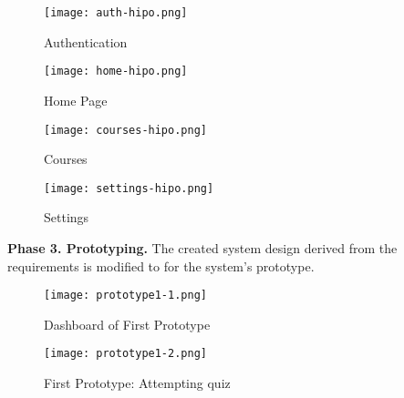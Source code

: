 \vspace{1cm}

\begin{figure}[h!]
   \begin{center}
      \texttt{[image: auth-hipo.png]}
      \caption{Authentication}
   \end{center}
\end{figure}

\vspace{1cm}

\begin{figure}[h!]
   \begin{center}
      \texttt{[image: home-hipo.png]}
      \caption{Home Page}
   \end{center}
\end{figure}

\vspace{1cm}

\begin{figure}[h!]
   \begin{center}
      \texttt{[image: courses-hipo.png]}
      \caption{Courses}
   \end{center}
\end{figure}

\vspace{1cm}

\begin{figure}[h!]
   \begin{center}
      \texttt{[image: settings-hipo.png]}
      \caption{Settings}
   \end{center}
\end{figure}

\textbf{Phase 3. Prototyping.}
The created system design derived from the requirements is modified to for the system's prototype.

\pagebreak

\begin{figure}[h!]
   \begin{center}
      \texttt{[image: prototype1-1.png]}
      \caption{Dashboard of First Prototype}
   \end{center}
\end{figure}

\begin{figure}[h!]
   \begin{center}
      \texttt{[image: prototype1-2.png]}
      \caption{First Prototype: Attempting quiz}
   \end{center}
\end{figure}

